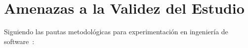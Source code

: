 \documentclass[11pt,a4paper]{article}
\begin{document}
\begingroup
\scriptsize
\renewcommand{\arraystretch}{1.2}
\label{tab:iso-matriz-calidad}

\endgroup

\newpage

\section{Amenazas a la Validez del Estudio}
\label{sec:amenazas-validez}
Siguiendo las pautas metodol\'ogicas para experimentaci\'on en ingenier\'ia de software~\cite{wohlin2012experimentation}:
\end{document}
